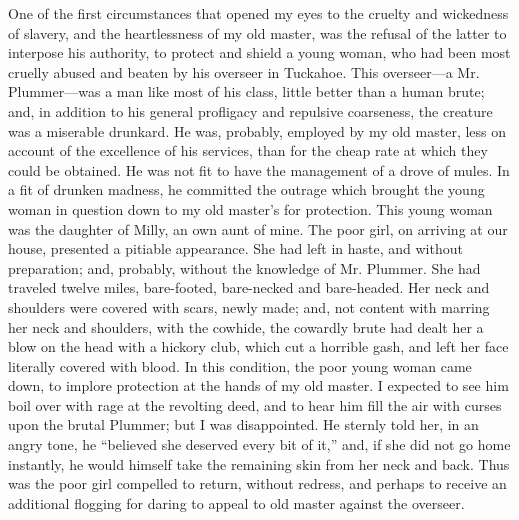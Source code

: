One of the first circumstances that opened my eyes to the cruelty and
wickedness of slavery, and the heartlessness of my old master, was the
refusal of the latter to interpose his authority, to protect and shield
a young woman, who had been most cruelly abused and beaten by his
overseer in Tuckahoe. This overseer---a Mr. Plummer---was a man like
most of his class, little better than a human brute; and, in addition to
his general profligacy and repulsive coarseness, the creature was a
miserable drunkard. He was, probably, employed by my old master, less on
account of the excellence of his services, than for the cheap rate at
which they could be obtained. He was not fit to have the management of a
drove of mules. In a fit of drunken madness, he committed the outrage
which brought the young woman in question down to my old master's for
protection. This young woman was the daughter of Milly, an own aunt of
mine. The poor girl, on arriving at our house, presented a pitiable
appearance. She had left in haste, and without preparation; and,
probably, without the knowledge of Mr. Plummer. She had traveled twelve
miles, bare-footed, bare-necked and bare-headed. Her neck and shoulders
were covered with scars, newly made; and, not content with marring her
neck and shoulders, with the cowhide, the cowardly brute had dealt her a
blow on the head with a hickory club, which cut a horrible gash, and
left her face literally covered with blood. In this condition, the poor
young woman came down, to implore protection at
{\protect\hypertarget{83}{}{}}the hands of my old master. I expected to
see him boil over with rage at the revolting deed, and to hear him fill
the air with curses upon the brutal Plummer; but I was disappointed. He
sternly told her, in an angry tone, he ``believed she deserved every bit
of it,'' and, if she did not go home instantly, he would himself take
the remaining skin from her neck and back. Thus was the poor girl
compelled to return, without redress, and perhaps to receive an
additional flogging for daring to appeal to old master against the
overseer.

